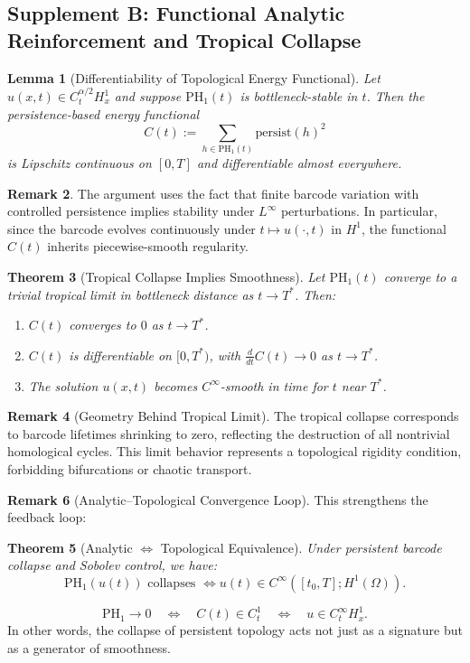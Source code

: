 \documentclass[11pt]{article}
\newtheorem{theorem}{Theorem}[section]
\newtheorem{lemma}[theorem]{Lemma}
\theoremstyle{definition}
\newtheorem{remark}[theorem]{Remark}
\begin{document}
\subsection*{Supplement B: Functional Analytic Reinforcement and Tropical Collapse}

\begin{lemma}[Differentiability of Topological Energy Functional]
\label{lem:Ct_differentiable}
Let $u(x,t) \in C^{\alpha/2}_t H^1_x$ and suppose $\mathrm{PH}_1(t)$ is bottleneck-stable in $t$. Then the persistence-based energy functional
\[
C(t) := \sum_{h \in \mathrm{PH}_1(t)} \mathrm{persist}(h)^2
\]
is Lipschitz continuous on $[0,T]$ and differentiable almost everywhere.
\end{lemma}

\begin{remark}
The argument uses the fact that finite barcode variation with controlled persistence implies stability under $L^\infty$ perturbations. In particular, since the barcode evolves continuously under $t \mapsto u(\cdot,t)$ in $H^1$, the functional $C(t)$ inherits piecewise-smooth regularity.
\end{remark}

\begin{theorem}[Tropical Collapse Implies Smoothness]
Let $\mathrm{PH}_1(t)$ converge to a trivial tropical limit in bottleneck distance as $t \to T^*$. Then:
\begin{enumerate}
  \item $C(t)$ converges to $0$ as $t \to T^*$.
  \item $C(t)$ is differentiable on $[0,T^*)$, with $\frac{d}{dt} C(t) \to 0$ as $t \to T^*$.
  \item The solution $u(x,t)$ becomes $C^\infty$-smooth in time for $t$ near $T^*$.
\end{enumerate}
\end{theorem}

\begin{remark}[Geometry Behind Tropical Limit]
The tropical collapse corresponds to barcode lifetimes shrinking to zero, reflecting the destruction of all nontrivial homological cycles. This limit behavior represents a topological rigidity condition, forbidding bifurcations or chaotic transport.
\end{remark}

\begin{remark}[Analytic–Topological Convergence Loop]
This strengthens the feedback loop:

\begin{theorem}[Analytic $\Leftrightarrow$ Topological Equivalence]
Under persistent barcode collapse and Sobolev control, we have:
\[
\mathrm{PH}_1(u(t)) \text{ collapses } \Longleftrightarrow u(t) \in C^\infty([t_0,T]; H^1(\Omega)).
\]
\end{theorem}
        \[
\mathrm{PH}_1 \to 0 \quad \Longleftrightarrow \quad C(t) \in C^1_t \quad \Longleftrightarrow \quad u \in C^\infty_t H^1_x.
\]
In other words, the collapse of persistent topology acts not just as a signature but as a generator of smoothness.
\end{remark}
\end{document}
